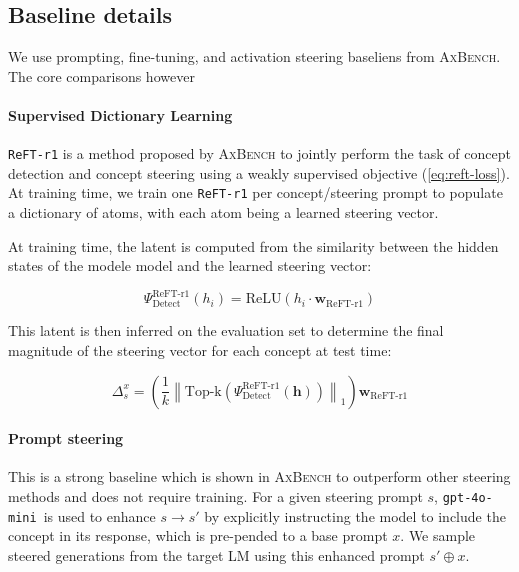 \documentclass[11pt]{article}
\newcommand{\gpt}{\texttt{gpt-4o-mini}}
\begin{document}
\subsection{Baseline details}
\label{appendix:baseline}


We use prompting, fine-tuning, and activation steering baseliens from \textsc{AxBench}. The core comparisons however 

\paragraph{Supervised Dictionary Learning} \texttt{ReFT-r1} is a method proposed by \textsc{AxBench} \cite{wu2025axbenchsteeringllmssimple} to jointly perform the task of concept detection and concept steering using a weakly supervised objective (\ref{eq:reft-loss}). At training time, we train one \texttt{ReFT-r1} per concept/steering prompt to populate a dictionary of atoms, with each atom being a learned steering vector. 

At training time, the latent is computed from the similarity between the hidden states of the modele model and the learned steering vector:

\begin{equation}
\Psi_{\text{Detect}}^{\text{ReFT-r1}}(h_i) = \mathrm{ReLU}(h_i \cdot \mathbf{w}_{\text{ReFT-r1}})
\end{equation}

This latent is then inferred on the evaluation set to determine the final magnitude of the steering vector for each concept at test time:

\begin{equation}
 \Delta^x_s = \left(\frac{1}{k}{\left\lVert    \text{Top-k}(\Psi_{\text{Detect}}^{\text{ReFT-r1}}(\mathbf{h})) \right\rVert_1}\right) \mathbf{w}_{\text{ReFT-r1}}
\end{equation}


\paragraph{Prompt steering} This is a strong baseline which is shown in \textsc{AxBench} to outperform other steering methods and does not require training. For a given steering prompt $s$, \gpt\ is used to 
enhance $s\to s'$ by explicitly instructing the model to include the concept in its response, which is pre-pended to a base prompt $x$. We sample steered generations from the target LM using this enhanced prompt $s'\oplus x$.
\end{document}
